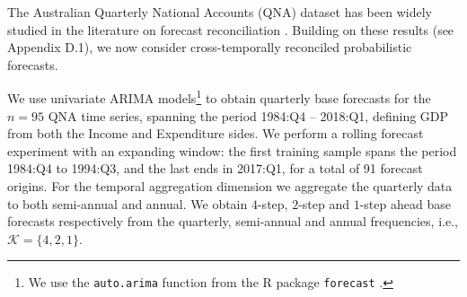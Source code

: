 \documentclass[12pt]{article}
\theoremstyle{definition}
\begin{document}
The Australian Quarterly National Accounts (QNA) dataset has been widely studied in the literature on forecast reconciliation \citep{athanasopoulos2020, difonzo2023}. Building on these results (see Appendix D.1), we now consider cross-temporally reconciled probabilistic forecasts.

We use univariate ARIMA models\footnote{We use the \texttt{auto.arima} function from the R package \texttt{forecast} \citep{Rforecast}.} to obtain quarterly base forecasts for the $n = 95$ QNA time series, spanning the period 1984:Q4 -- 2018:Q1, defining GDP from both the Income and Expenditure sides. We perform a rolling forecast experiment with an expanding window: the first training sample spans the period 1984:Q4 to 1994:Q3, and the last ends in 2017:Q1, for a total of 91 forecast origins. For the temporal aggregation dimension we aggregate the quarterly data to both semi-annual and annual. We obtain $4$-step, $2$-step and $1$-step ahead base forecasts respectively from the quarterly, semi-annual and annual frequencies, i.e., $\mathcal{K} = \{4,2,1\}$.
\end{document}
